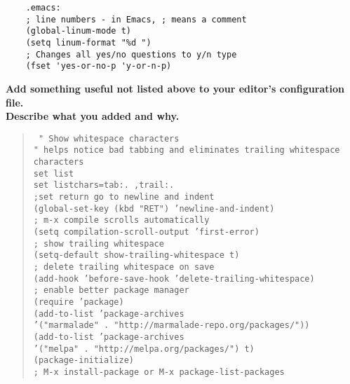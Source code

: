 \documentclass{article}
\begin{document}
\begin{enumerate}
    {\color{red}
    \begin{lstlisting}
    .emacs:
    ; line numbers - in Emacs, ; means a comment
    (global-linum-mode t)
    (setq linum-format "%d ")
    ; Changes all yes/no questions to y/n type
    (fset 'yes-or-no-p 'y-or-n-p)
    \end{lstlisting}
    }
    \textbf{Add something useful not listed above to your editor's configuration file.\\
      Describe  what you added and why.}
      \begin{quote}\tt\small
        \color{blue}
        " Show whitespace characters\\
        " helps notice bad tabbing and eliminates trailing whitespace characters\\
        set list\\
        set listchars=tab:.\ ,trail:.\\

        \color{red}
        ;set return go to newline and indent\\
        (global-set-key (kbd "RET") 'newline-and-indent)\\

        ; m-x compile scrolls automatically\\
        (setq compilation-scroll-output 'first-error)\\

        ; show trailing whitespace\\
        (setq-default show-trailing-whitespace t)\\
        ; delete trailing whitespace on save\\
        (add-hook 'before-save-hook 'delete-trailing-whitespace)\\

        ; enable better package manager\\
        (require 'package)\\
        (add-to-list 'package-archives\\
                     '("marmalade" . "http://marmalade-repo.org/packages/"))\\
        (add-to-list 'package-archives\\
                     '("melpa" . "http://melpa.org/packages/") t)\\
        (package-initialize)\\
        ; M-x install-package or M-x package-list-packages\\


\end{quote}
\end{enumerate}
\end{document}
